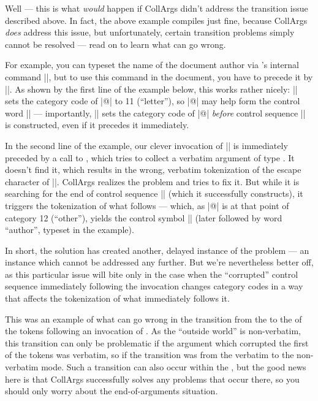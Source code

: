 \documentclass[a4paper,11pt]{article}
\begin{document}

Well --- this is what \emph{would} happen if CollArgs didn't address the
transition issue described above.  In fact, the above example compiles just
fine, because CollArgs \emph{does} address this issue, but unfortunately,
certain transition problems simply cannot be resolved --- read on to learn what
can go wrong.

For example, you can typeset the name of the document author via
's internal command |\@author|, but to use this command in the
document, you have to precede it by |\makeatletter|.  As shown by the first
line of the example below, this works rather nicely: |\makeatletter| sets the
category code of |@| to 11 (``letter''), so |@| may help form the control word
|\@author| --- importantly, |\makeatletter| sets the category code of |@|
\emph{before} control sequence |\@author| is constructed, even if it precedes
it immediately.

\long{}

In the second line of the example, our clever invocation of |\@author| is
immediately preceded by a call to , which tries to
collect a verbatim argument of type .  It doesn't find it, which results in
the wrong, verbatim tokenization of the escape character of |\makeletter|.
CollArgs realizes the problem and tries to fix it.  But while it is searching
for the end of control sequence |\makeletter| (which it successfully
constructs), it triggers the tokenization of what follows --- which, as |@| is
at that point of category 12 (``other''), yields the control symbol |\@| (later
followed by word ``author'', typeset in the example).

In short, the solution has created another, delayed instance of the problem ---
an instance which cannot be addressed any further.  But we're nevertheless
better off, as this particular issue will bite only in the case when the
``corrupted'' control sequence immediately following the invocation
 changes category codes in a way that affects the
tokenization of what immediately follows it.

This was an example of what can go wrong in the transition from the
 to the  of the tokens following an invocation
of .  As the ``outside world'' is non-verbatim, this
transition can only be problematic if the argument which corrupted the first of
the  tokens was verbatim, so if the transition was from the verbatim
to the non-verbatim mode.  Such a transition can also occur within the
, but the good news here is that CollArgs successfully
solves any problems that occur there, so you should only worry about the
end-of-arguments situation.
\end{document}

